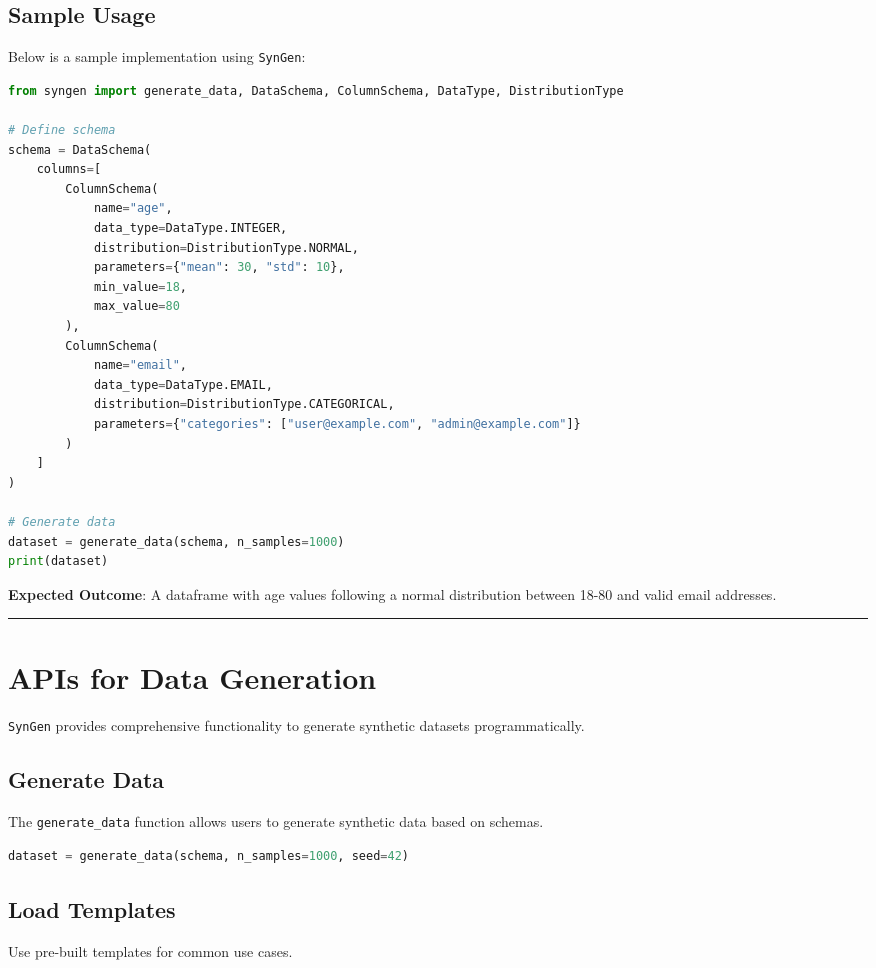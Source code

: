 \documentclass{article}
\newcommand{\horizbar}{
    \vspace{1em}
    \hrule height 1pt
    \vspace{1em}
}
\begin{document}
    \subsection{Sample Usage}
    Below is a sample implementation using \texttt{SynGen}:

    \begin{lstlisting}[language=Python, caption=Sample Usage of SynGen]
from syngen import generate_data, DataSchema, ColumnSchema, DataType, DistributionType

# Define schema
schema = DataSchema(
    columns=[
        ColumnSchema(
            name="age",
            data_type=DataType.INTEGER,
            distribution=DistributionType.NORMAL,
            parameters={"mean": 30, "std": 10},
            min_value=18,
            max_value=80
        ),
        ColumnSchema(
            name="email",
            data_type=DataType.EMAIL,
            distribution=DistributionType.CATEGORICAL,
            parameters={"categories": ["user@example.com", "admin@example.com"]}
        )
    ]
)

# Generate data
dataset = generate_data(schema, n_samples=1000)
print(dataset)
    \end{lstlisting}

    \noindent\textbf{Expected Outcome}: A dataframe with age values following a normal distribution between 18-80 and valid email addresses.

    \horizbar


    \section{APIs for Data Generation}
    \texttt{SynGen} provides comprehensive functionality to generate synthetic datasets programmatically.

    \subsection{Generate Data}
    The \texttt{generate\_data} function allows users to generate synthetic data based on schemas.

    \begin{lstlisting}[language=Python, caption=API Example: Generate Data]
dataset = generate_data(schema, n_samples=1000, seed=42)
    \end{lstlisting}

    \subsection{Load Templates}
    Use pre-built templates for common use cases.
\end{document}
